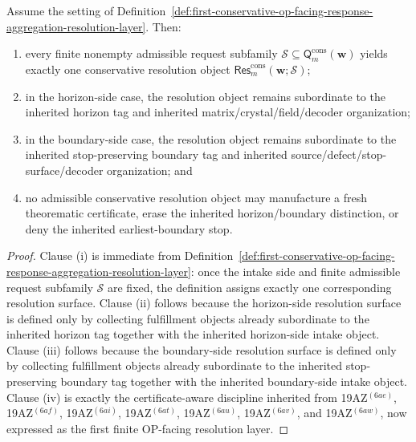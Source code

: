 \begin{proposition}
\label{prop:every-finite-admissible-conservative-fulfillment-family-yields-exactly-one-route-faithful-conservative-resolution-object}
Assume the setting of Definition~\ref{def:first-conservative-op-facing-response-aggregation-resolution-layer}. Then:
\begin{enumerate}[label=(\roman*)]
  \item every finite nonempty admissible request subfamily \(\mathcal S\subseteq \mathsf{Q}^{\mathrm{cons}}_{m}(\mathbf w)\) yields exactly one conservative resolution object \(\mathsf{Res}^{\mathrm{cons}}_{m}(\mathbf w;\mathcal S)\);
  \item in the horizon-side case, the resolution object remains subordinate to the inherited horizon tag and inherited matrix/crystal/field/decoder organization;
  \item in the boundary-side case, the resolution object remains subordinate to the inherited stop-preserving boundary tag and inherited source/defect/stop-surface/decoder organization; and
  \item no admissible conservative resolution object may manufacture a fresh theorematic certificate, erase the inherited horizon/boundary distinction, or deny the inherited earliest-boundary stop.
\end{enumerate}
\end{proposition}

\begin{proof}
Clause (i) is immediate from Definition~\ref{def:first-conservative-op-facing-response-aggregation-resolution-layer}: once the intake side and finite admissible request subfamily \(\mathcal S\) are fixed, the definition assigns exactly one corresponding resolution surface. Clause (ii) follows because the horizon-side resolution surface is defined only by collecting fulfillment objects already subordinate to the inherited horizon tag together with the inherited horizon-side intake object. Clause (iii) follows because the boundary-side resolution surface is defined only by collecting fulfillment objects already subordinate to the inherited stop-preserving boundary tag together with the inherited boundary-side intake object. Clause (iv) is exactly the certificate-aware discipline inherited from 19AZ$^{(6ae)}$, 19AZ$^{(6af)}$, 19AZ$^{(6ai)}$, 19AZ$^{(6at)}$, 19AZ$^{(6au)}$, 19AZ$^{(6av)}$, and 19AZ$^{(6aw)}$, now expressed as the first finite OP-facing resolution layer.
\end{proof}

